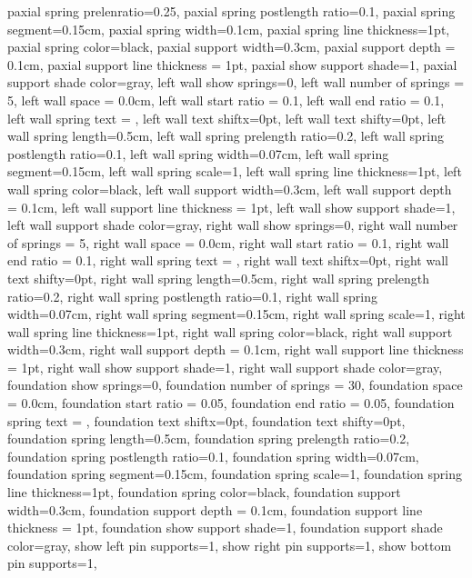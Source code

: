 {{  paxial spring prelenratio=0.25,
  paxial spring postlength ratio=0.1,
  paxial spring segment=0.15cm,
  paxial spring width=0.1cm,
  paxial spring line thickness=1pt,
  paxial spring color=black,
  paxial support width=0.3cm,
  paxial support depth = 0.1cm,
  paxial support line thickness = 1pt,
  paxial show support shade=1,
  paxial support shade color=gray,
  left wall show springs=0,
  left wall number of springs = 5,
  left wall space = 0.0cm,
  left wall start ratio = 0.1,
  left wall end ratio = 0.1,
  left wall spring text = {},
  left wall text shiftx=0pt,
  left wall text shifty=0pt,
  left wall spring length=0.5cm,
  left wall spring prelength ratio=0.2,
  left wall spring postlength ratio=0.1,
  left wall spring width=0.07cm,
  left wall spring segment=0.15cm,
  left wall spring scale=1,
  left wall spring line thickness=1pt,
  left wall spring color=black,
  left wall support width=0.3cm,
  left wall support depth = 0.1cm,
  left wall support line thickness = 1pt,
  left wall show support shade=1,
  left wall support shade color=gray,
  right wall show springs=0,
  right wall number of springs = 5,
  right wall space = 0.0cm,
  right wall start ratio = 0.1,
  right wall end ratio = 0.1,
  right wall spring text = {},
  right wall text shiftx=0pt,
  right wall text shifty=0pt,
  right wall spring length=0.5cm,
  right wall spring prelength ratio=0.2,
  right wall spring postlength ratio=0.1,
  right wall spring width=0.07cm,
  right wall spring segment=0.15cm,
  right wall spring scale=1,
  right wall spring line thickness=1pt,
  right wall spring color=black,
  right wall support width=0.3cm,
  right wall support depth = 0.1cm,
  right wall support line thickness = 1pt,
  right wall show support shade=1,
  right wall support shade color=gray,
  foundation show springs=0,
  foundation number of springs = 30,
  foundation space = 0.0cm,
  foundation start ratio = 0.05,
  foundation end ratio = 0.05,
  foundation spring text = {},
  foundation text shiftx=0pt,
  foundation text shifty=0pt,
  foundation spring length=0.5cm,
  foundation spring prelength ratio=0.2,
  foundation spring postlength ratio=0.1,
  foundation spring width=0.07cm,
  foundation spring segment=0.15cm,
  foundation spring scale=1,
  foundation spring line thickness=1pt,
  foundation spring color=black,
  foundation support width=0.3cm,
  foundation support depth = 0.1cm,
  foundation support line thickness = 1pt,
  foundation show support shade=1,
  foundation support shade color=gray,
  show left pin supports=1,
  show right pin supports=1,
  show bottom pin supports=1,
}}
